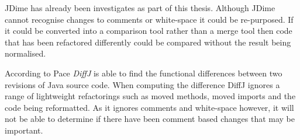 JDime has already been investigates as part of this thesis.
Although JDime cannot recognise changes to comments or white-space it could be re-purposed.
If it could be converted into a comparison tool rather than a merge tool then code that has been refactored differently could be compared without the result being normalised.

According to Pace \cite{Pace} \emph{DiffJ} is able to find the functional differences between two revisions of Java source code.
When computing the difference DiffJ ignores a range of lightweight refactorings such as moved methods, moved imports and the code being reformatted. 
As it ignores comments and white-space however, it will not be able to determine if there have been comment based changes that may be important. 



% 
% 

